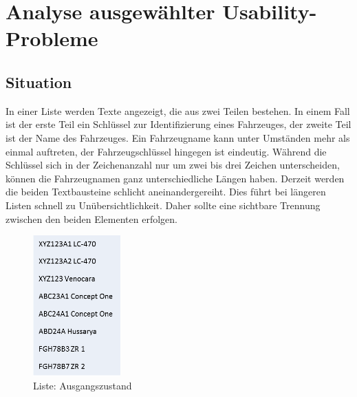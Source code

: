 \chapter{Analyse ausgewählter Usability-Probleme}
\section{Situation} \label{sec:analyseSituation}
In einer Liste werden Texte angezeigt, die aus zwei Teilen bestehen. In einem Fall ist der erste Teil ein Schlüssel zur Identifizierung eines Fahrzeuges, der zweite Teil ist der Name des Fahrzeuges. Ein Fahrzeugname kann unter Umständen mehr als einmal auftreten, der Fahrzeugschlüssel hingegen ist eindeutig. Während die Schlüssel sich in der Zeichenanzahl nur um zwei bis drei Zeichen unterscheiden, können die Fahrzeugnamen ganz unterschiedliche Längen haben. Derzeit werden die beiden Textbausteine schlicht aneinandergereiht. Dies führt bei längeren Listen schnell zu Unübersichtlichkeit. Daher sollte eine sichtbare Trennung zwischen den beiden Elementen erfolgen.

\begin{figure}[H]
 \centering
 \includegraphics[width=0.3\textwidth]{grafiken/Liste_Beispiel.png}
 \caption{Liste: Ausgangszustand}
 \label{fig:liste1}
\end{figure}

